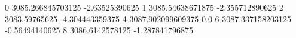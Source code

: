0 3085.266845703125 -2.63525390625
1 3085.54638671875 -2.355712890625
2 3083.59765625 -4.304443359375
4 3087.902099609375 0.0
6 3087.337158203125 -0.56494140625
8 3086.6142578125 -1.287841796875

